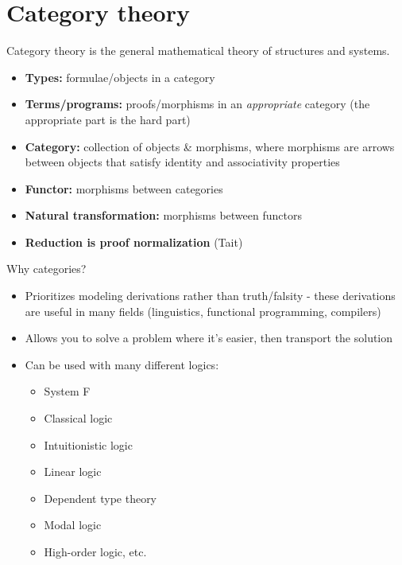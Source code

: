 \documentclass[11pt]{article}
\begin{document}
\section{Category theory}
Category theory is the general mathematical theory of structures and systems.
\begin{itemize}
    \item \textbf{Types:} formulae/objects in a category
    \item \textbf{Terms/programs:} proofs/morphisms in an \textit{appropriate} category (the appropriate part is the hard part)
    \item \textbf{Category:} collection of objects \& morphisms, where morphisms are arrows between objects that satisfy identity and associativity properties
    \item \textbf{Functor:} morphisms between categories
    \item \textbf{Natural transformation:} morphisms between functors
    \item \textbf{Reduction is proof normalization} (Tait)
\end{itemize}
Why categories? 
\begin{itemize}
    \item Prioritizes modeling derivations rather than truth/falsity - these derivations are useful in many fields (linguistics, functional programming, compilers)
    \item Allows you to solve a problem where it's easier, then transport the solution
    \item Can be used with many different logics:
        \begin{itemize}
            \item System F
            \item Classical logic
            \item Intuitionistic logic
            \item Linear logic
            \item Dependent type theory
            \item Modal logic
            \item High-order logic, etc.
        \end{itemize}
\end{itemize}
\end{document}
